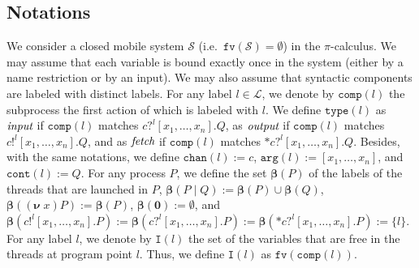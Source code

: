 \documentclass{article}
\newcommand{\bydef}{:=}
\newcommand{\picalcul}{$\pi$-calculus}
\newcommand{\Labels}{\mathcal{L}}
\newcommand{\concu}{|}
\newcommand{\nuu}{\nu\;}
\newcommand{\repli}{\ast}
\newcommand{\rec}{?}
\newcommand{\eme}{!}
\newcommand{\prolabel}{\Labels}
\newcommand{\System}{\mathcal{S}}
\newcommand{\FN}{\texttt{fv}}
\newcommand{\interface}{\mathtt{I}}
\newcommand{\type}{\texttt{type}}
\newcommand{\Extract}{\mathbf{\beta}}
\newcommand{\component}{\texttt{comp}}
\newcommand{\inputm}{\emph{input}}
\newcommand{\outputm}{\emph{output}}
\newcommand{\fetch}{\emph{fetch}}
\newcommand{\args}{\texttt{arg}}
\newcommand{\canal}{\texttt{chan}}
\newcommand{\cont}{\texttt{cont}}
\begin{document}
\subsection{Notations}
We consider a closed mobile system $\System$ (i.e.~$\FN(\System)=\emptyset$) in the \picalcul.
We may assume  that each variable is bound  exactly once in the system (either by a name restriction or by an input).
We may also assume that syntactic components  are labeled with distinct labels.
For any label $l\in\prolabel$, we denote by $\component(l)$  the subprocess the first action of which is labeled with  $l$.
We define $\type(l)$ as $\inputm$ if  $\component(l)$ matches $c\rec^l[x_1,\ldots,x_n].Q$, as $\outputm$ if  $\component(l)$ matches $c\eme^l[x_1,\ldots,x_n].Q$, and as $\fetch$ if  $\component(l)$ matches $\repli c\rec^l[x_1,\ldots,x_n].Q$.
Besides, with the same notations, we define $\canal(l)\bydef c$, $\args(l)\bydef[x_1,\ldots,x_n]$, and $\cont(l)\bydef Q$. 
For any process $P$, we define the set $\Extract(P)$ of the labels of the threads that are launched in $P$, 
$\Extract(P \;\concu\; Q)  \bydef   \Extract(P) \cup \Extract(Q)$, 
$\Extract((\mathbf{\nuu}x)P) \bydef  \Extract(P)$, 
$\Extract(\mathbf{0})  \bydef  \emptyset$, and 
$\Extract(c\eme^l[x_1,\ldots,x_n].P) \bydef \Extract(c\rec^l[x_1,\ldots,x_n].P) \bydef
\Extract(\repli c\rec^l[x_1,\ldots,x_n].P) \bydef \{l\}$.
For any label $l$, we denote by $\interface(l)$ the set of the variables that are free  in the threads at program point $l$.
Thus, we define $\interface(l)$ as $\FN(\component(l))$.
\end{document}
